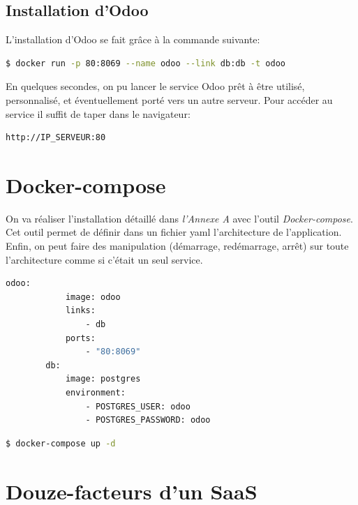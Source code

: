 \section*{Installation d'Odoo}

	L'installation d'Odoo se fait grâce à la commande suivante:
	\begin{lstlisting}[language=bash,caption=Installation d'Odoo]
		$ docker run -p 80:8069 --name odoo --link db:db -t odoo
	\end{lstlisting}

	En quelques secondes, on pu lancer le service Odoo prêt à être utilisé, personnalisé, et éventuellement porté vers un autre serveur. Pour accéder au service il suffit de taper dans le navigateur:

	\begin{lstlisting}[language=bash]
		http://IP_SERVEUR:80
	\end{lstlisting}

	




\chapter{Docker-compose}

	On va réaliser l'installation détaillé dans \emph{l'Annexe A} avec l'outil \emph{Docker-compose}. Cet outil permet de définir dans un fichier \acrshort{yaml} l'architecture de l'application. Enfin, on peut faire des manipulation (démarrage, redémarrage, arrêt) sur toute l'architecture comme si c'était un seul service.

	\begin{lstlisting}[language=bash,caption=Installation d'Odoo avec Docker-compose]
		odoo:
	  		image: odoo
		  	links:
		   		- db
		  	ports:
		   		- "80:8069"
		db:
		  	image: postgres
		  	environment:
  				- POSTGRES_USER: odoo
  				- POSTGRES_PASSWORD: odoo
	\end{lstlisting}

	\begin{lstlisting}[language=bash,caption=Lancement d'Odoo avec Docker-compose]
		$ docker-compose up -d
	\end{lstlisting}



\chapter{Douze-facteurs d'un SaaS}
\label{annexe:12factors}

